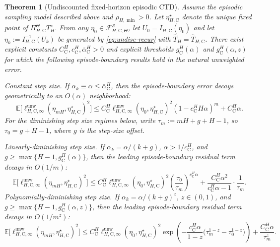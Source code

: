 \documentclass{article}
\newtheorem{theorem}{Theorem}
\newcommand{\X}{\mathcal{S}}
\newcommand{\E}{\mathbb{E}}
\begin{document}
\begin{theorem}[Undiscounted fixed-horizon episodic CTD]\label{thm:undisc-ctd}
Assume the episodic sampling model described above and $\rho_{H,\min}>0$. Let $\eta_{H,\mathrm C}^\star$ denote the unique fixed point of $\Pi_{H,\mathrm C}^{\Theta} T_H^\pi$. From any $\eta_0\in\mathcal F_{H,\mathrm C,\Theta}^{\X}$, let $U_0=I_{H,\mathrm C}(\eta_0)$ and let $\eta_k := I_{H,\mathrm C}^{-1}(U_k)$ be generated by \eqref{eq:undisc-recur} with $\widehat T_{H} = \widehat T_{H,\mathrm C}$. There exist explicit constants $C^H_\mathrm C, c^H_\mathrm C, \bar \alpha ^H_\mathrm C > 0$ and explicit thresholds $g^H_\mathrm C(\alpha)$ and $g^H_\mathrm C(\alpha, z)$ for which the following episode-boundary results hold in the natural unweighted error.

\textup{Constant step size.} If $\alpha_k \equiv \alpha \le \bar \alpha^H_\mathrm C$, then the episode-boundary error decays geometrically to an $O(\alpha)$ neighborhood:
\begin{equation}
\E\bigl[\ell_{H, \mathrm C, \infty}^{\mathrm{unw}}(\eta_{mH}, \eta_{H,\mathrm C}^\star)^2 \bigr] \le C^{H}_\mathrm C \ell_{H,\mathrm C, \infty}^{\mathrm{unw}}(\eta_0, \eta_{H,\mathrm C}^\star)^2(1- c^{H}_\mathrm C H\alpha)^m + C^{H}_\mathrm C \alpha.
\end{equation}
For the diminishing step size regimes below, write $\tau_m := mH+g+H-1$, so $\tau_0 = g+H-1$, where $g$ is the step-size offset.

\textup{Linearly-diminishing step size.} If $\alpha_k = \alpha / (k+g)$, $\alpha > 1/c^{H}_\mathrm C$, and $g \ge \max\{H-1,g^{H}_\mathrm C(\alpha)\}$, then the leading episode-boundary residual term decays in $O(1/m)$:
\begin{equation}
\E\bigl[\ell_{H,\mathrm C, \infty}^{\mathrm{unw}}(\eta_{mH}, \eta_{H,\mathrm C}^\star)^2 \bigr] \le C^{H}_\mathrm C \ell_{H, \mathrm C, \infty}^{\mathrm{unw}}(\eta_0, \eta_{H,\mathrm C}^\star)^2\left(\frac{\tau_0}{\tau_m} \right)^{c^{H}_\mathrm C\alpha} + \frac{C^{H}_\mathrm C \alpha^2}{c^{H}_\mathrm C\alpha -1} \cdot \frac{1}{\tau_m}.
\end{equation}
\textup{Polynomially-diminishing step size.} If $\alpha_k = \alpha/(k+g)^z$, $z \in (0,1)$, and $g \ge \max\{H-1,g^{H}_\mathrm C(\alpha, z)\}$, then the leading episode-boundary residual term decays in $O(1/m^z)$:
\begin{equation}
\E\bigl[\ell_{H, \mathrm C, \infty}^{\mathrm{unw}}(\eta_{mH}, \eta_{H,\mathrm C}^\star)^2 \bigr] \le C^{H}_\mathrm C \ell_{H, \mathrm C, \infty}^{\mathrm{unw}}(\eta_0, \eta_{H,\mathrm C}^\star)^2\exp\left(-\frac{c^{H}_\mathrm C \alpha}{1-z} \bigl(\tau^{1-z}_m - \tau^{1-z}_0 \bigr) \right) + \frac{C^{H}_\mathrm C \alpha}{\tau_m^z}.
\end{equation}
\end{theorem}
\end{document}
